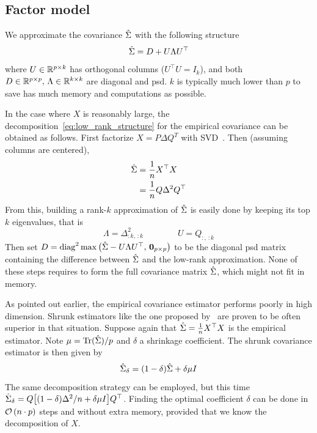\subsection{Factor model}\label{subsec:factor_model}

We approximate the covariance $\hat{\Sigma}$ with the following structure
\begin{equation}\label{eq:low_rank_structure}
    \hat{\Sigma} = D + U \Lambda U^\top
\end{equation}
where $U \in \mathbb{R}^{p \times k}$ has orthogonal columns ($U^\top U = I_k$),
and both $D \in \mathbb{R}^{p \times p},\, \Lambda \in \mathbb{R}^{k \times k}$
are diagonal and psd.
$k$ is typically much lower than $p$ to save has much memory and computations as possible.

In the case where $X$ is reasonably large,
the decomposition~\ref{eq:low_rank_structure} for the empirical covariance can be obtained as follows.
First factorize $X = P \Delta Q^T$ with SVD~\citep{svd}.
Then (assuming columns are centered),
\begin{align*}
    \hat{\Sigma} &= \frac{1}{n}X^\top X\\
    &= \frac{1}{n}Q \Delta^2 Q^\top
\end{align*}
From this, building a rank-$k$ approximation of $\hat{\Sigma}$ is easily done by keeping its top $k$ eigenvalues,
that is
\begin{equation*}
    \Lambda = \Delta^2_{:k,\, :k} \qquad\qquad U = Q_{:,\, :k}
\end{equation*}
Then set $D = \operatorname*{diag}^2\max \big( \hat{\Sigma} - U \Lambda U^\top,\, \mathbf{0}_{p \times p} \big)$
to be the diagonal psd matrix containing
the difference between $\hat{\Sigma}$ and the low-rank approximation.
None of these steps requires to form the full covariance matrix $\hat{\Sigma}$, which might not fit in memory.

As pointed out earlier, the empirical covariance estimator performs poorly in high dimension.
Shrunk estimators like the one proposed by~\cite{ledoit_wolf} are proven to be often superior in that situation.
Suppose again that $\hat{\Sigma} = \frac{1}{n}X^\top X$ is the empirical estimator.
Note $\mu = \operatorname*{Tr}( \hat{\Sigma} ) / p$ and $\delta$ a shrinkage coefficient.
The shrunk covariance estimator is then given by
\begin{equation*}
    \hat{\Sigma}_\delta = (1 - \delta)\hat{\Sigma} + \delta\mu I
\end{equation*}
The same decomposition strategy can be employed,
but this time $\hat{\Sigma}_\delta = Q\big[ (1 - \delta) \Delta^2 / n + \delta\mu I \big] Q^\top$.
Finding the optimal coefficient $\delta$ can be done in $\mathcal{O}\left( n \cdot p \right)$ steps
and without extra memory, provided that we know the decomposition of $X$.

